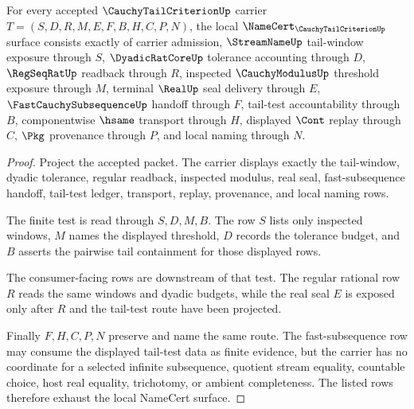 \begin{theorem}
\label{thm:cauchy-tail-criterion-namecert-obligations}
For every accepted $\CauchyTailCriterionUp$ carrier $T=(S,D,R,M,E,F,B,H,C,P,N)$, the local $\NameCert_{\CauchyTailCriterionUp}$ surface consists exactly of carrier admission, $\StreamNameUp$ tail-window exposure through $S$, $\DyadicRatCoreUp$ tolerance accounting through $D$, $\RegSeqRatUp$ readback through $R$, inspected $\CauchyModulusUp$ threshold exposure through $M$, terminal $\RealUp$ seal delivery through $E$, $\FastCauchySubsequenceUp$ handoff through $F$, tail-test accountability through $B$, componentwise $\hsame$ transport through $H$, displayed $\Cont$ replay through $C$, $\Pkg$ provenance through $P$, and local naming through $N$.
\end{theorem}
\begin{proof}
Project the accepted packet. The carrier displays exactly the tail-window, dyadic tolerance, regular readback, inspected modulus, real seal, fast-subsequence handoff, tail-test ledger, transport, replay, provenance, and local naming rows.

The finite test is read through $S,D,M,B$. The row $S$ lists only inspected windows, $M$ names the displayed threshold, $D$ records the tolerance budget, and $B$ asserts the pairwise tail containment for those displayed rows.

The consumer-facing rows are downstream of that test. The regular rational row $R$ reads the same windows and dyadic budgets, while the real seal $E$ is exposed only after $R$ and the tail-test route have been projected.

Finally $F,H,C,P,N$ preserve and name the same route. The fast-subsequence row may consume the displayed tail-test data as finite evidence, but the carrier has no coordinate for a selected infinite subsequence, quotient stream equality, countable choice, host real equality, trichotomy, or ambient completeness. The listed rows therefore exhaust the local NameCert surface.
\end{proof}

